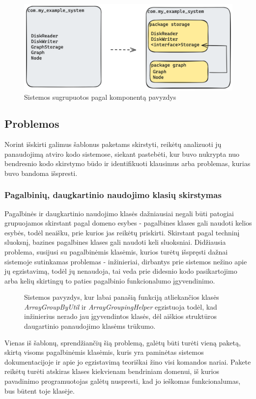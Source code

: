 \begin{figure}[H]
    \centering
    \includegraphics[scale=0.2]{img/component_packaging}
    \caption{Sistemos sugrupuotos pagal komponentą pavyzdys}
    \label{img:component_packaging}
\end{figure}

\subsection{Problemos}
Norint išskirti galimus šablonus paketams skirstyti, reikėtų
analizuoti jų panaudojimą atviro kodo sistemose, siekant pastebėti, kur buvo nukrypta nuo bendresnio kodo skirstymo
būdo ir identifikuoti klausimus arba problemas, kurias buvo bandoma išspresti.


\subsubsection{Pagalbinių, daugkartinio naudojimo klasių skirstymas}
Pagalbinės ir daugkartinio naudojimo klasės dažniausiai negali būti patogiai grupuojamos skirstant pagal domeno esybes - pagalbines klases gali
naudoti kelios esybės, todėl neaišku, prie kurios jas reikėtų priskirti. Skirstant pagal techninį sluoksnį, bazines pagalbines klases gali naudoti keli
sluoksniai.
Didžiausia problema, susijusi su pagalbinėmis klasėmis, kurios turėtų išspręsti dažnai sistemoje sutinkamas problemas -
inžinieriai, dirbantys prie sistemos nežino apie jų egzistavimą, todėl jų nenaudoja,
tai veda prie didesnio kodo pasikartojimo arba kelių skirtingų to paties pagalbinio funkcionalumo įgyvendinimo.

\begin{figure}[H]
\snugshade
{}
\endsnugshade
\caption{Sistemos pavyzdys, kur labai panašią funkciją atliekančios klasės \textit{ArrayGroupByUtil} ir \textit{ArrayGroupingHelper}
egzistuoja todėl, kad inžinierius nerado jau įgyvendintos klasės, dėl aiškios struktūros daugartinio
panaudojimo klasėms trūkumo.}
\end{figure}
Vienas iš šablonų, sprendžiančių šią problemą, galėtų būti turėti vieną paketą, skirtą visoms pagalbinėmis klasėmis, kuris yra paminėtas sistemos
dokumentacijoje ir apie jo egzistavimą teoriškai žino visi komandos nariai.
Pakete reikėtų turėti atskiras klases kiekvienam bendriniam domenui, iš kurios pavadinimo programuotojas galėtų nuspresti,
kad jo ieškomas funkcionalumas, bus būtent toje klasėje.

